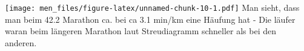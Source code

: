 \documentclass[
]{article}
\newenvironment{Shaded}{\begin{snugshade}}{\end{snugshade}}
\newcommand{\AttributeTok}[1]{\textcolor[rgb]{0.77,0.63,0.00}{#1}}
\newcommand{\CommentTok}[1]{\textcolor[rgb]{0.56,0.35,0.01}{\textit{#1}}}
\newcommand{\FunctionTok}[1]{\textcolor[rgb]{0.00,0.00,0.00}{#1}}
\newcommand{\NormalTok}[1]{#1}
\newcommand{\SpecialCharTok}[1]{\textcolor[rgb]{0.00,0.00,0.00}{#1}}
\newcommand{\StringTok}[1]{\textcolor[rgb]{0.31,0.60,0.02}{#1}}
\begin{document}
\begin{Shaded}
\end{Shaded}

\texttt{[image: men\_files/figure-latex/unnamed-chunk-10-1.pdf]} Man
sieht, dass man beim 42.2 Marathon ca. bei ca 3.1 min/km eine Häufung
hat - Die läufer waran beim längeren Marathon laut Streudiagramm
schneller als bei den anderen.
\end{document}

